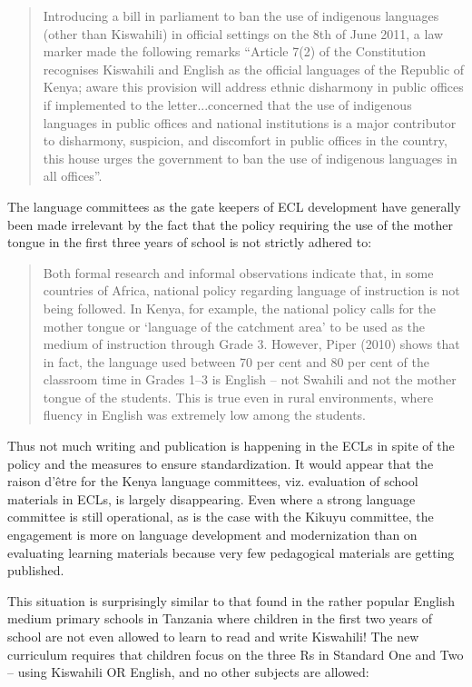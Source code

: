 \documentclass[output=paper,colorlinks,citecolor=brown]{langscibook}
\begin{document}
\begin{quotation}
Introducing a bill in parliament  to ban the use of indigenous languages (other than Kiswahili) in official settings on the 8th of June 2011, a law marker made the following remarks  “Article 7(2) of the Constitution recognises Kiswahili and English as the official languages of the Republic of Kenya; aware this provision will address ethnic disharmony in public offices if implemented to the letter...concerned that the use of indigenous languages in public offices and national institutions is a major contributor to disharmony, suspicion, and discomfort in public offices in the country, this house urges the government to ban the use of indigenous languages in all offices”. \hfill \citep[21]{Kenya-National-Assembly-Official-Records2011}  
\end{quotation}

The language committees as the gate keepers of ECL development have generally been made irrelevant by the fact that the policy requiring the use of the mother tongue in the first three years of school is not strictly adhered to: 

\begin{quotation}
Both formal research and informal observations indicate that, in some countries of Africa, national policy regarding language of instruction is not being followed. In Kenya, for example, the national policy calls for the mother tongue or ‘language of the catchment area’ to be used as the medium of instruction through Grade 3. However, Piper (2010) shows that in fact, the language used between 70 per cent and 80 per cent of the classroom time in Grades 1–3 is English – not Swahili and not the mother tongue of the students. This is true even in rural environments, where fluency in English was extremely low among the students.  \hfill \citep[156]{Trudell2013}
\end{quotation}{}

Thus not much writing and publication is happening in the ECLs in spite of the policy and the measures to ensure standardization.  It would appear that the raison d’être for the Kenya language committees, viz. evaluation of school materials in ECLs, is largely disappearing. Even where a strong language committee is still operational, as is the case with the Kikuyu committee, the engagement is more on language development and modernization than on evaluating learning materials because very few pedagogical materials are getting published. 

This situation is surprisingly similar to that found in the rather popular English medium primary schools in Tanzania where children in the first two years of school are not even allowed to learn to read and write Kiswahili! The new curriculum requires that children focus on the three Rs in Standard One and Two – using Kiswahili OR English, and no other subjects are allowed:
\end{document}
